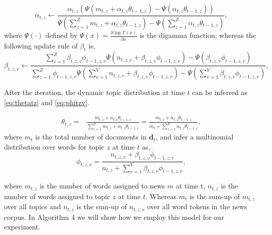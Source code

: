 {\begin{equation}\label{tot_alpha}
\alpha_{t, z} \leftarrow \frac{\alpha_{t, z} \left( \Psi(m_{t, z} + \alpha_{t, z} \theta_{t-1, z}) - \Psi(\alpha_{t, z} \theta_{t-1, z}) \right)}{ \Psi(\sum_{z=1}^Z m_{t, z} + \alpha_{t, z} \theta_{t-1, z}) - \Psi(\sum_{z=1}^Z \alpha_{t, z} \theta_{t-1, z}) },
\end{equation}
%
where $\Psi(\cdot)$ defined by $\Psi(x)=\frac{\partial\log\Gamma(x)}{\partial x}$ is the digamma function; whereas the following update rule of $\beta_t$ is,
%
\begin{equation}\label{tot_beta}
\beta_{t, z, v} \leftarrow  \frac{\sum_{z=1}^Z \beta_{t, z, v} \phi_{t-1, z, v} \Psi(n_{t, z, v} +\beta_{t, z, v} \phi_{t-1, z, v}) - \Psi(\beta_{t, z, v} \phi_{t-1, z, v})}{ \sum_{z=1}^Z \phi_{t-1, z, v}  \Psi(\sum_{v=1}^V n_{t, z, v} + \beta_{t, z, v} \phi_{t-1, z, v}) - \Psi(\sum_{v=1}^V \beta_{t, z, v} \phi_{t-1, z, v})},
\end{equation}

After the iteration, the dynamic topic distribution at time $t$ can be inferred as \ref{eq:thetatz} and \ref{eq:phitzv}.

\begin{align}
\label{eq:thetatz}
\theta_{t, z}  = & \frac{ m_{t, z} + \alpha_{t, z}\theta_{t-1, z} }{ \sum_{z=1}^Z m_{t, z} + \alpha_{t, z} \theta_{t-1, z}} = \frac{ m_{t, z} + \alpha_{t, z}\theta_{t-1, z} }{ m_t + \sum_{z=1}^Z \alpha_{t, z}\theta_{t-1, z} },
\end{align}
where $m_t$ is the total number of documents in $\mathbf{d}_t$, and infer a multinomial distribution over words for topic $z$ at time $t$ as,
%
\begin{equation}
\label{eq:phitzv}
\phi_{t, z, v} =  \frac{ n_{t, z,v } + \beta_{t, z, v} \phi_{t-1, z, v} }{ n_{t,z} + \sum_{v=1}^V \beta_{t, z, v} \phi_{t-1, z, v} },
\end{equation}

where $m_{t,z}$ is the number of words assigned to news $m$ at time t, $n_{t, z}$ is the number of words assigned to topic $z$ at time $t$. Whereas $m_t$ is the sum-up of $m_{t,z}$ over all topics and $n_{t, z}$ is the sum-up of $n_{t, z, v}$ over all word tokens in the news corpus. In Algorithm 4 we will show how we employ this model for our experiment.
\begin{algorithm}\label{algo:TOT}
\DontPrintSemicolon
\LinesNotNumbered
 

\end{algorithm}}
